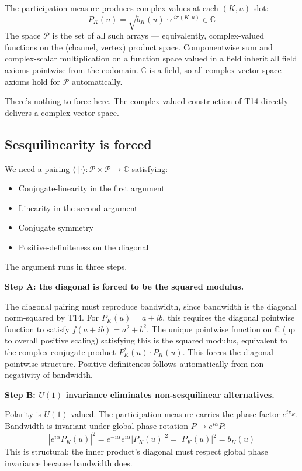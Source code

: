 \documentclass[11pt,a4paper]{article}
\begin{document}
The participation measure produces complex values at each $(K, u)$ slot:
\[
P_K(u) = \sqrt{b_K(u)} \cdot e^{i\pi(K,u)} \in \mathbb{C}
\]
The space $\mathcal{P}$ is the set of all such arrays --- equivalently, complex-valued functions on the (channel, vertex) product space. Componentwise sum and complex-scalar multiplication on a function space valued in a field inherit all field axioms pointwise from the codomain. $\mathbb{C}$ is a field, so all complex-vector-space axioms hold for $\mathcal{P}$ automatically.

There's nothing to force here. The complex-valued construction of T14 directly delivers a complex vector space.

\subsection{Sesquilinearity is forced}

We need a pairing $\langle \cdot|\cdot\rangle: \mathcal{P}\times\mathcal{P} \to \mathbb{C}$ satisfying:

\begin{itemize}[noitemsep]
  \item Conjugate-linearity in the first argument
  \item Linearity in the second argument
  \item Conjugate symmetry
  \item Positive-definiteness on the diagonal
\end{itemize}

The argument runs in three steps.

\textbf{Step A: the diagonal is forced to be the squared modulus.}

The diagonal pairing must reproduce bandwidth, since bandwidth is the diagonal norm-squared by T14. For $P_K(u) = a + ib$, this requires the diagonal pointwise function to satisfy $f(a + ib) = a^2 + b^2$. The unique pointwise function on $\mathbb{C}$ (up to overall positive scaling) satisfying this is the squared modulus, equivalent to the complex-conjugate product $P^*_K(u) \cdot P_K(u)$. This forces the diagonal pointwise structure. Positive-definiteness follows automatically from non-negativity of bandwidth.

\textbf{Step B: $U(1)$ invariance eliminates non-sesquilinear alternatives.}

Polarity is $U(1)$-valued. The participation measure carries the phase factor $e^{i\pi_K}$. Bandwidth is invariant under global phase rotation $P \to e^{i\alpha}P$:
\[
|e^{i\alpha} P_K(u)|^{2} = e^{-i\alpha} e^{i\alpha} |P_K(u)|^{2} = |P_K(u)|^{2} = b_K(u)
\]
This is structural: the inner product's diagonal must respect global phase invariance because bandwidth does.
\end{document}
